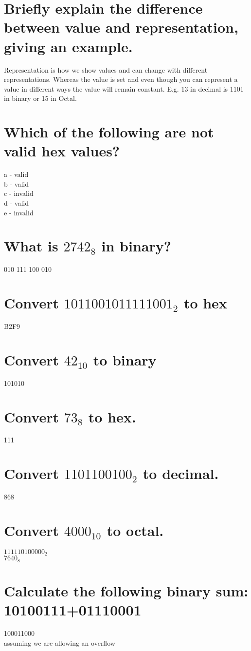 \documentclass{article}
\begin{document}
\section{Briefly explain the difference between value and representation, giving an example.}
Representation is how we show values and can change with different
representations. Whereas the value is set and even though you can represent a
value in different ways the value will remain constant. E.g. 13 in decimal is
1101 in binary or 15 in Octal.

\section{Which of the following are not valid hex values?}
a - valid\\
b - valid\\
c - invalid\\
d - valid\\
e - invalid

\section{What is $2742_8$ in binary?}
010 111 100 010

\section{Convert $1011 0010 1111 1001_2$ to hex}
B2F9

\section{Convert $42_{10}$ to binary} 101010

\section{Convert $73_8$ to hex.}
111

\section{Convert $1101100100_2$ to decimal.}
868

\section{Convert $4000_{10}$ to octal.} $111 110 100 000_2$\\
$7640_8$

\section{Calculate the following binary sum: 10100111+01110001}
100011000\\
assuming we are allowing an overflow
\end{document}
